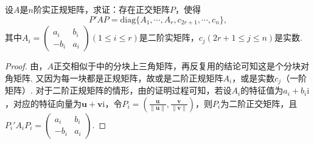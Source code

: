 \documentclass[../../main.tex]{subfiles}
\begin{document}
\begin{proposition}\label{proposition:例9.90}
设\(A\)是\(n\)阶实正规矩阵，求证：存在正交矩阵\(P\)，使得
\[
P'AP = \mathrm{diag}\{A_1,\cdots,A_r,c_{2r + 1},\cdots,c_n\},
\]
其中\(A_i=\begin{pmatrix}a_i&b_i\\-b_i&a_i\end{pmatrix}(1\leqslant  i\leqslant  r)\)是二阶实矩阵，\(c_j(2r + 1\leqslant  j\leqslant  n)\)是实数.
\end{proposition}
\begin{proof}
由，\(A\)正交相似于中的分块上三角矩阵，再反复用的结论可知这是个分块对角矩阵. 又因为每一块都是正规矩阵，故或是二阶正规矩阵\(A_i\)，或是实数\(c_j\)（一阶矩阵）. 对于二阶正规矩阵的情形，由的证明过程可知，若设\(A_i\)的特征值为\(a_i + b_i\mathrm{i}\)，对应的特征向量为\(\boldsymbol{u}+ \boldsymbol{v}\mathrm{i}\)，令\(P_i = (\frac{\boldsymbol{u}}{\|\boldsymbol{u}\|},\frac{\boldsymbol{v}}{\|\boldsymbol{v}\|})\)，则\(P_i\)为二阶正交矩阵，且\(P_i'A_iP_i=\begin{pmatrix}a_i&b_i\\-b_i&a_i\end{pmatrix}\). 

\end{proof}
\end{document}
